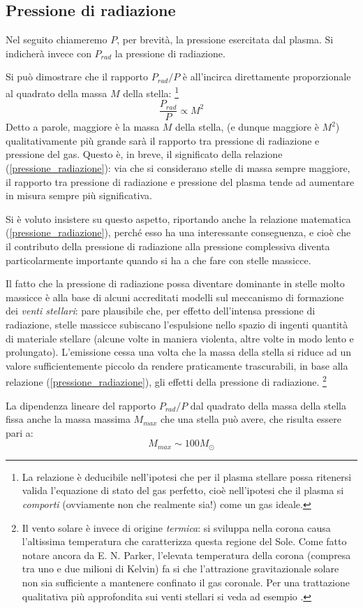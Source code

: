 \subsection{Pressione di radiazione}\label{prad}
Nel seguito chiameremo $P$, per brevit\`{a}, la pressione esercitata dal plasma. Si indicher\`{a} invece con $P_{rad}$ la pressione di radiazione.
\par
Si può dimostrare che il rapporto $P_{rad}/P$ è all'incirca direttamente proporzionale al quadrato della massa $M$ della stella: \footnote{La relazione è deducibile nell'ipotesi che per il plasma stellare possa ritenersi valida l'equazione di stato del gas perfetto, cioè nell'ipotesi che il plasma si \emph{comporti} (ovviamente non che realmente sia!) come un gas ideale.}
\begin{equation}\label{pressione_radiazione}
\frac{P_{rad}}{P} \propto M^{2}
\end{equation}
Detto a parole, maggiore è la massa $M$ della stella, (e dunque maggiore è $M^{2}$) qualitativamente più grande sar\`{a} il rapporto tra pressione di radiazione e pressione del gas. Questo è, in breve, il significato della relazione (\ref{pressione_radiazione}): via che si considerano stelle di massa sempre maggiore, il rapporto tra pressione di radiazione e pressione del plasma tende ad aumentare in misura sempre più significativa.
\par
Si è voluto insistere su questo aspetto, riportando anche la relazione matematica (\ref{pressione_radiazione}), perch\'{e} esso ha una interessante conseguenza, e cioè che il contributo della pressione di radiazione alla pressione complessiva diventa particolarmente importante quando si ha a che fare con stelle massicce. 
\par
Il fatto che la pressione di radiazione possa diventare dominante in stelle molto massicce è alla base di alcuni accreditati modelli sul meccanismo di formazione dei \emph{venti stellari}: pare plausibile che, per effetto dell'intensa pressione di radiazione, stelle massicce subiscano l'espulsione nello spazio di ingenti quantit\`{a} di materiale stellare (alcune volte in maniera violenta, altre volte in modo lento e prolungato). L'emissione cessa una volta che la massa della stella si riduce ad un valore sufficientemente piccolo da rendere praticamente trascurabili, in base alla relazione (\ref{pressione_radiazione}), gli effetti della pressione di radiazione. \footnote{Il vento solare è invece di origine \emph{termica}: si sviluppa nella corona causa l'altissima temperatura che caratterizza questa regione del Sole. Come fatto notare ancora da E. N. Parker, l'elevata temperatura della corona (compresa tra uno e due milioni di Kelvin) fa  si che l'attrazione gravitazionale solare non sia sufficiente a mantenere confinato il gas coronale. Per una trattazione qualitativa più approfondita sui venti stellari si veda ad esempio \Cite{WE}.}
\par
La dipendenza lineare del rapporto $P_{rad}/P$ dal quadrato della massa della stella fissa anche la massa massima $M_{max}$ che una stella può avere, che risulta essere pari a:
\begin{displaymath}
M_{max}\sim 100 M_{\odot}
\end{displaymath}

